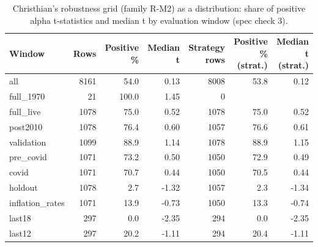 \begin{table}[htbp]
\centering
\footnotesize
\caption{Christhian's robustness grid (family R-M2) as a distribution: share of positive alpha t-statistics and median t by evaluation window (spec check 3).}
\label{tab:m7_grid_windows}
\begin{tabular}{lrrrrrr}
\toprule
Window & Rows & Positive \% & Median t & Strategy rows & Positive \% (strat.) & Median t (strat.) \\
\midrule
all & 8161 & 54.0 & 0.13 & 8008 & 53.8 & 0.12 \\
full\_1970 & 21 & 100.0 & 1.45 & 0 &  &  \\
full\_live & 1078 & 75.0 & 0.52 & 1078 & 75.0 & 0.52 \\
post2010 & 1078 & 76.4 & 0.60 & 1057 & 76.6 & 0.61 \\
validation & 1099 & 88.9 & 1.14 & 1078 & 88.9 & 1.15 \\
pre\_covid & 1071 & 73.2 & 0.50 & 1050 & 72.9 & 0.49 \\
covid & 1071 & 70.7 & 0.44 & 1050 & 70.5 & 0.44 \\
holdout & 1078 & 2.7 & -1.32 & 1057 & 2.3 & -1.34 \\
inflation\_rates & 1071 & 13.9 & -0.73 & 1050 & 13.3 & -0.74 \\
last18 & 297 & 0.0 & -2.35 & 294 & 0.0 & -2.35 \\
last12 & 297 & 20.2 & -1.11 & 294 & 20.4 & -1.11 \\
\bottomrule
\end{tabular}
\par{}
\end{table}
